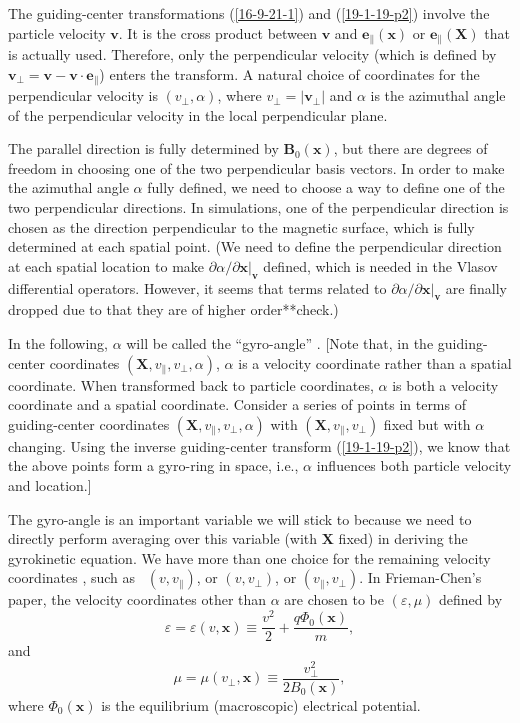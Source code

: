 \documentclass{llncs}
\newcommand{\nobracket}{}
\newcommand{\tmmathbf}[1]{\ensuremath{\boldsymbol{#1}}}
\begin{document}
The guiding-center transformations (\ref{16-9-21-1}) and (\ref{19-1-19-p2})
involve the particle velocity $\mathbf{v}$. It is the cross product between
$\mathbf{v}$ and $\tmmathbf{e}_{\parallel} (\mathbf{x})$ or
$\tmmathbf{e}_{\parallel} (\mathbf{X})$ that is actually used. Therefore, only
the perpendicular velocity (which is defined by $\mathbf{v}_{\perp}
=\mathbf{v}-\mathbf{v} \cdot \mathbf{e}_{\parallel}$) enters the transform. A
natural choice of coordinates for the perpendicular velocity is $(v_{\perp},
\alpha)$, where $v_{\perp} = | \mathbf{v}_{\perp} |$ and $\alpha$ is the
azimuthal angle of the perpendicular velocity in the local perpendicular
plane.

The parallel direction is fully determined by $\mathbf{B}_0 (\mathbf{x})$, but
there are degrees of freedom in choosing one of the two perpendicular basis
vectors. In order to make the azimuthal angle $\alpha$ fully defined, we need
to choose a way to define one of the two perpendicular directions. In
{} simulations, one of the perpendicular direction is chosen as
the direction perpendicular to the magnetic surface, which is fully determined
at each spatial point. (We need to define the perpendicular direction at each
spatial location to make $\partial \alpha / \partial \mathbf{x} |_{\mathbf{v}}
\nobracket$ defined, which is needed in the Vlasov differential operators.
However, it seems that terms related to $\partial \alpha / \partial \mathbf{x}
|_{\mathbf{v}} \nobracket$ are finally dropped due to that they are of higher
order**check.)

In the following, $\alpha$ will be called the ``gyro-angle'' . [Note that, in
the guiding-center coordinates $(\mathbf{X}, v_{\parallel}, v_{\perp},
\alpha)$, $\alpha$ is a velocity coordinate rather than a spatial coordinate.
When transformed back to particle coordinates, $\alpha$ is both a velocity
coordinate and a spatial coordinate. Consider a series of points in terms of
guiding-center coordinates $(\mathbf{X}, v_{\parallel}, v_{\perp}, \alpha)$
with $(\mathbf{X}, v_{\parallel}, v_{\perp})$ fixed but with $\alpha$
changing. Using the inverse guiding-center transform (\ref{19-1-19-p2}), we
know that the above points form a gyro-ring in space, i.e., $\alpha$
influences both particle velocity and location.]

The gyro-angle is an important variable we will stick to because we need to
directly perform averaging over this variable (with $\mathbf{X}$ fixed) in
deriving the gyrokinetic equation. We have more than one choice for the
remaining velocity coordinates , such as \ $(v, v_{\parallel})$, or $(v,
v_{\perp})$, or $(v_{\parallel}, v_{\perp})$. In Frieman-Chen's paper, the
velocity coordinates other than $\alpha$ are chosen to be $(\varepsilon, \mu)$
defined by
\begin{equation}
  \varepsilon = \varepsilon (v, \mathbf{x}) \equiv \frac{v^2}{2} + \frac{q
  \Phi_0 (\mathbf{x})}{m},
\end{equation}
and
\begin{equation}
  \mu = \mu (v_{\perp}, \mathbf{x}) \equiv \frac{v_{\perp}^2}{2 B_0
  (\mathbf{x})},
\end{equation}
where $\Phi_0 (\mathbf{x})$ is the equilibrium (macroscopic) electrical
potential.
\end{document}
